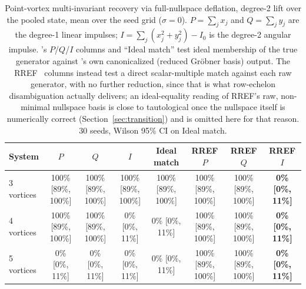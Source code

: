 \documentclass{article}
\begin{document}
\begin{table}[H]
\centering
\caption{Point-vortex multi-invariant recovery via full-nullspace deflation, degree-2 lift over the pooled state, mean over the seed grid ($\sigma=0$). $P=\sum_j x_j$ and $Q=\sum_j y_j$ are the degree-1 linear impulses; $I=\sum_j(x_j^2+y_j^2)-I_0$ is the degree-2 angular impulse. \SRGBCSNP's $P$/$Q$/$I$ columns and ``Ideal match'' test ideal membership of the true generator against \SRGBCSNP's own canonicalized (reduced Gr\"{o}bner basis) output. The RREF~\cite{OellerichEmelianenko2024} columns instead test a direct scalar-multiple match against each raw generator, with no further reduction, since that is what row-echelon disambiguation actually delivers; an ideal-equality reading of RREF's raw, non-minimal nullspace basis is close to tautological once the nullspace itself is numerically correct (Section~\ref{sec:transition}) and is omitted here for that reason. 30 seeds, Wilson 95\% CI on Ideal match.}
\label{tab:vortex}
\footnotesize
\begin{tabular}{lccccccc}
\toprule
\textbf{System} & $P$ & $Q$ & $I$ & \textbf{Ideal match} & RREF $P$ & RREF $Q$ & RREF $I$\\
\midrule
3 vortices & 100\% [89\%, 100\%] & 100\% [89\%, 100\%] & 100\% [89\%, 100\%] & 100\% [89\%, 100\%] & 100\% [89\%, 100\%] & 100\% [89\%, 100\%] & \textbf{0\% [0\%, 11\%]}\\
4 vortices & 100\% [89\%, 100\%] & 100\% [89\%, 100\%] & 0\% [0\%, 11\%] & 0\% [0\%, 11\%] & 100\% [89\%, 100\%] & 100\% [89\%, 100\%] & \textbf{0\% [0\%, 11\%]}\\
5 vortices & 0\% [0\%, 11\%] & 0\% [0\%, 11\%] & 0\% [0\%, 11\%] & 0\% [0\%, 11\%] & 100\% [89\%, 100\%] & 100\% [89\%, 100\%] & \textbf{0\% [0\%, 11\%]}\\
\bottomrule
\end{tabular}
\end{table}
\end{document}

